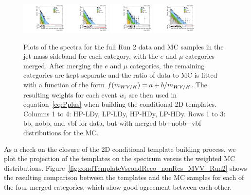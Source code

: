 \begin{figure}[htbp]
  \includegraphics[width=0.2\textwidth]{fig/2Dfit/slopesSB_b1_allL_HP_vbf_LDy_Run2_mWV_1OverX.pdf}
  \includegraphics[width=0.2\textwidth]{fig/2Dfit/slopesSB_b1_allL_LP_vbf_LDy_Run2_mWV_1OverX.pdf}
  \includegraphics[width=0.2\textwidth]{fig/2Dfit/slopesSB_b1_allL_HP_vbf_HDy_Run2_mWV_1OverX.pdf}
  \includegraphics[width=0.2\textwidth]{fig/2Dfit/slopesSB_b1_allL_LP_vbf_HDy_Run2_mWV_1OverX.pdf}\\
  \caption{
    Plots of the \MVV spectra for the full Run 2 data and MC samples in the jet mass sideband for each category, with the $e$ and $\mu$ categories merged.
    After merging the $e$ and $\mu$ categories, the remaining categories are kept separate and the ratio of data to MC is fitted with a function of the form $f(m_{WV/H})=a+b/m_{WV/H}$.
    The resulting weights for each event $w_i$ are then used in equation~\ref{eq:Pplus} when building the conditional 2D templates.
    Columns 1 to 4: HP-LDy, LP-LDy, HP-HDy, LP-HDy.
    Rows 1 to 3: bb, nobb, and vbf for data, but with merged bb+nobb+vbf distributions for the MC.
  }
  \label{fig:nonResMvvSpectrumReweighting}
\end{figure}

As a check on the closure of the 2D conditional template building process, we plot the projection of the templates on the \MVV spectrum versus the weighted MC distributions.
Figure~\ref{fig:condTemplateVscondReco_nonRes_MVV_Run2} shows the resulting comparison between the templates and the MC samples for each of the four merged categories, which show good agreement between each other.

